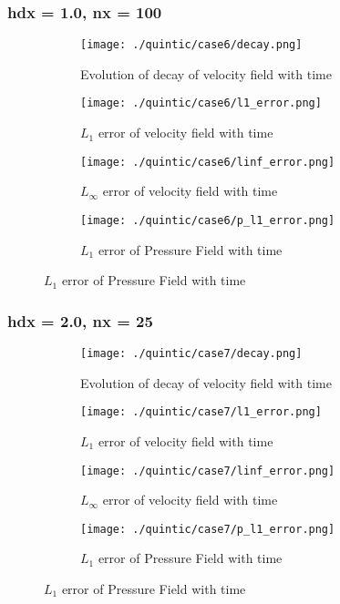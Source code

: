\documentclass[11pt, a4paper]{article}
\begin{document}
\subsubsection{hdx = 1.0, nx = 100}
\begin{figure}[H]
\begin{subfigure}{0.48\textwidth}
\texttt{[image: ./quintic/case6/decay.png]}
\caption{Evolution of decay of velocity field with time}
\end{subfigure}
\begin{subfigure}{0.48\textwidth}
\texttt{[image: ./quintic/case6/l1\_error.png]}
\caption{$L_1$ error of velocity field with time}
\end{subfigure}
\medskip
\begin{subfigure}{0.48\textwidth}
\texttt{[image: ./quintic/case6/linf\_error.png]}
\caption{$L_\infty$ error of velocity field with time}
\end{subfigure}
\begin{subfigure}{0.48\textwidth}
\texttt{[image: ./quintic/case6/p\_l1\_error.png]}
\caption{$L_1$ error of Pressure Field with time}
\end{subfigure}
\end{figure}

\subsubsection{hdx = 2.0, nx = 25}
\begin{figure}[H]
\begin{subfigure}{0.48\textwidth}
\texttt{[image: ./quintic/case7/decay.png]}
\caption{Evolution of decay of velocity field with time}
\end{subfigure}
\begin{subfigure}{0.48\textwidth}
\texttt{[image: ./quintic/case7/l1\_error.png]}
\caption{$L_1$ error of velocity field with time}
\end{subfigure}
\medskip
\begin{subfigure}{0.48\textwidth}
\texttt{[image: ./quintic/case7/linf\_error.png]}
\caption{$L_\infty$ error of velocity field with time}
\end{subfigure}
\begin{subfigure}{0.48\textwidth}
\texttt{[image: ./quintic/case7/p\_l1\_error.png]}
\caption{$L_1$ error of Pressure Field with time}
\end{subfigure}
\end{figure}
\end{document}
